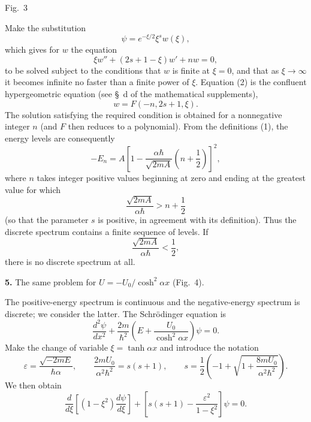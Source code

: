 \begin{center}

\small Fig.~3
\end{center}

Make the substitution
\[
  \psi=e^{-\xi/2}\xi^sw(\xi),
\]
which gives for $w$ the equation
\begin{equation}
  \xi w''+(2s+1-\xi)w'+nw=0,
  \tag{2}
\end{equation}
to be solved subject to the conditions that $w$ is finite at $\xi=0$, and
that as $\xi\to\infty$ it becomes infinite no faster than a finite power of
$\xi$. Equation (2) is the confluent hypergeometric equation (see \S~d of the
mathematical supplements),
\[
  w=F(-n,2s+1,\xi).
\]
The solution satisfying the required condition is obtained for a
nonnegative integer $n$ (and $F$ then reduces to a polynomial). From the
definitions (1), the energy levels are consequently
\[
  -E_n=A\left[1-\frac{\alpha\hbar}{\sqrt{2mA}}
  \left(n+\frac12\right)\right]^2,
\]
where $n$ takes integer positive values beginning at zero and ending at the
greatest value for which
\[
  \frac{\sqrt{2mA}}{\alpha\hbar}>n+\frac12
\]
(so that the parameter $s$ is positive, in agreement with its definition).
Thus the discrete spectrum contains a finite sequence of levels. If
\[
  \frac{\sqrt{2mA}}{\alpha\hbar}<\frac12,
\]
there is no discrete spectrum at all.

\ProblemHeading
\noindent\textbf{5.} The same problem for
$U=-U_0/\cosh^2\alpha x$ (Fig.~4).

\SolutionHeading
The positive-energy spectrum is continuous and the negative-energy spectrum
is discrete; we consider the latter. The Schrödinger equation is
\[
  \frac{d^2\psi}{dx^2}+\frac{2m}{\hbar^2}
  \left(E+\frac{U_0}{\cosh^2\alpha x}\right)\psi=0.
\]
Make the change of variable $\xi=\tanh\alpha x$ and introduce the notation
\[
  \varepsilon=\frac{\sqrt{-2mE}}{\hbar\alpha},\qquad
  \frac{2mU_0}{\alpha^2\hbar^2}=s(s+1),\qquad
  s=\frac12\left(-1+\sqrt{1+\frac{8mU_0}{\alpha^2\hbar^2}}\right).
\]
We then obtain
\[
  \frac d{d\xi}\left[(1-\xi^2)\frac{d\psi}{d\xi}\right]
  +\left[s(s+1)-\frac{\varepsilon^2}{1-\xi^2}\right]\psi=0.
\]

